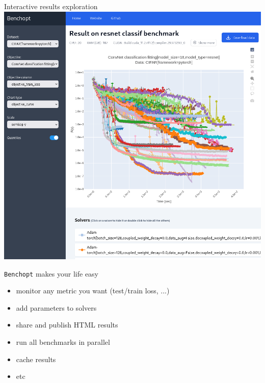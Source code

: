 \documentclass[unknownkeysallowed]{beamer}
\newcommand{\Benchopt}{\texttt{Benchopt}}
\begin{document}
\begin{frame}{Interactive results exploration}
    \centering
    \includegraphics[width=0.8\linewidth]{../sharedimages/benchopt_convnet.png}
\end{frame}


\begin{frame}{\Benchopt{} makes your life easy}

    \begin{itemize}
        \item monitor any metric you want (test/train loss, ...)
        \item add parameters to solvers
        \item share and publish HTML results
        \item run all benchmarks in parallel
        \item cache results
        \item etc
    \end{itemize}
\end{frame}
\end{document}
